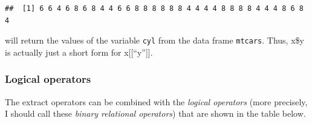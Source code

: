 \documentclass[
  12pt,
  oneside]{book}
\theoremstyle{definition}
\theoremstyle{definition}
\theoremstyle{definition}
\theoremstyle{definition}
\theoremstyle{remark}
\begin{document}
\begin{verbatim}
##  [1] 6 6 4 6 8 6 8 4 4 6 6 8 8 8 8 8 8 4 4 4 4 8 8 8 8 4 4 4 8 6 8 4
\end{verbatim}

will return the values of the variable \texttt{cyl} from the data frame \texttt{mtcars}.
Thus, x\$y is actually just a short form for x{[}{[}``y''{]}{]}.

\hypertarget{logical-operators}{%
\subsubsection{Logical operators}\label{logical-operators}}

The extract operators can be combined with the \emph{logical operators} (more precisely, I should call these \emph{binary relational operators}) that are shown in the table below.
\end{document}
